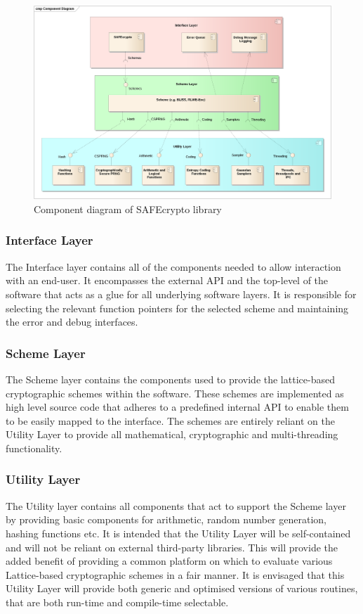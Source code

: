 \begin{figure}[!h]
\centering
\includegraphics[width=\textwidth]{libsafecrypto_development_view.png}
\caption{Component diagram of SAFEcrypto library}
\label{fig:safecrypto_components}
\end{figure}

\subsubsection{Interface Layer}

The Interface layer contains all of the components needed to allow interaction with an end-user. It encompasses the external API and the top-level of the software that acts as a glue for all underlying software layers. It is responsible for selecting the relevant function pointers for the selected scheme and maintaining the error and debug interfaces.

\subsubsection{Scheme Layer}

The Scheme layer contains the components used to provide the lattice-based cryptographic schemes within the software. These schemes are implemented as high level source code that adheres to a predefined internal API to enable them to be easily mapped to the interface. The schemes are entirely reliant on the Utility Layer to provide all mathematical, cryptographic and multi-threading functionality.

\subsubsection{Utility Layer}

The Utility layer contains all components that act to support the Scheme layer by providing basic components for arithmetic, random number generation, hashing functions etc. It is intended that the Utility Layer will be self-contained and will not be reliant on external third-party libraries. This will provide the added benefit of providing a common platform on which to evaluate various Lattice-based cryptographic schemes in a fair manner. It is envisaged that this Utility Layer will provide both generic and optimised versions of various routines, that are both run-time and compile-time selectable.


